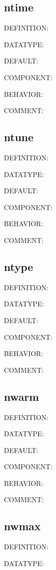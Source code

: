 \subsection{ntime}
{\color{red}DEFINITION:}

{\color{green}DATATYPE:}

{\color{blue}DEFAULT:}

{\color{brown}COMPONENT:}

{\color{purple}BEHAVIOR:}

{\color{olive}COMMENT:}

\subsection{ntune}
{\color{red}DEFINITION:}

{\color{green}DATATYPE:}

{\color{blue}DEFAULT:}

{\color{brown}COMPONENT:}

{\color{purple}BEHAVIOR:}

{\color{olive}COMMENT:}

\subsection{ntype}
{\color{red}DEFINITION:}

{\color{green}DATATYPE:}

{\color{blue}DEFAULT:}

{\color{brown}COMPONENT:}

{\color{purple}BEHAVIOR:}

{\color{olive}COMMENT:}

\subsection{nwarm}
{\color{red}DEFINITION:}

{\color{green}DATATYPE:}

{\color{blue}DEFAULT:}

{\color{brown}COMPONENT:}

{\color{purple}BEHAVIOR:}

{\color{olive}COMMENT:}

\subsection{nwmax}
{\color{red}DEFINITION:}

{\color{green}DATATYPE:}

